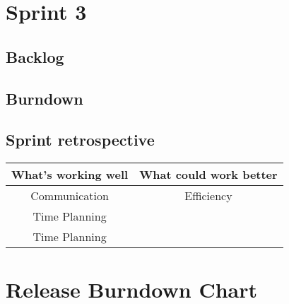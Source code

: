 \documentclass[]{report}
\begin{document}
\newpage
\chapter{Sprint 3}
\label{chap:Spring 3}

\section{Backlog}


\section{Burndown}


\section{Sprint retrospective}

\begin{center}
\begin{tabular}{|c|c|}
\hline \textbf{What's working well} & \textbf{What could work better} \\ 
\hline Communication & Efficiency \\ 
 Time Planning &  \\ 
 Time Planning &  \\ 
\hline 
\end{tabular} 
\end{center}



\newpage
\chapter{Release Burndown Chart}
\label{chap:Release Burndown Chart}
\begin{center}
\end{center}
\end{document}
